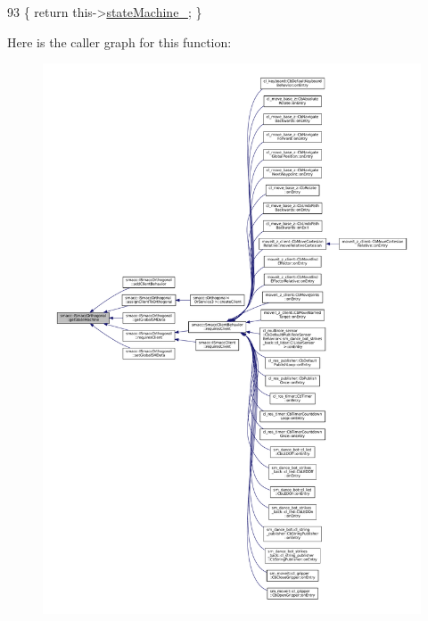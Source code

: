 \begin{DoxyCode}
93 \{ \textcolor{keywordflow}{return} this->\hyperlink{classsmacc_1_1ISmaccOrthogonal_a418b2e094a65013444ec1fca7e94f28d}{stateMachine\_}; \}
\end{DoxyCode}
Here is the caller graph for this function\+:
\nopagebreak
\begin{figure}[H]
\begin{center}
\leavevmode
\includegraphics[width=350pt]{classsmacc_1_1ISmaccOrthogonal_aae265ec480b8ed552ddc79afd2d93a62_icgraph}
\end{center}
\end{figure}
\mbox{\label{classsmacc_1_1ISmaccOrthogonal_a35f4d2955445dc1a4b2dafbca2f0bd16}} 
